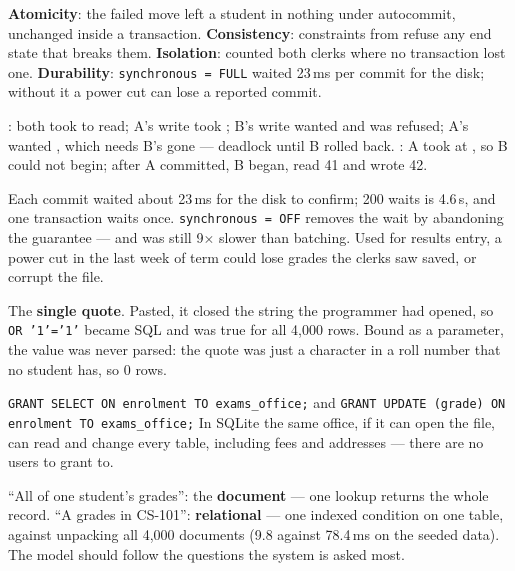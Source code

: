 \begin{ans}
  \item \textbf{Atomicity}: the failed move left a student in nothing under
        autocommit, unchanged inside a transaction. \textbf{Consistency}:
        constraints from  refuse any end state that breaks
        them. \textbf{Isolation}:  counted both clerks where
        no transaction lost one. \textbf{Durability}: \texttt{synchronous =
        FULL} waited 23\,ms per commit for the disk; without it a power cut can
        lose a reported commit.
  \item {}: both took  to read; A's write took
        ; B's write wanted  and was refused;
        A's  wanted , which needs B's
         gone --- deadlock until B rolled back.
        : A took  at , so B
        could not begin; after A committed, B began, read 41 and wrote 42.
  \item Each commit waited about 23\,ms for the disk to confirm; 200 waits is
        4.6\,s, and one transaction waits once. \texttt{synchronous = OFF}
        removes the wait by abandoning the guarantee --- and was still
        9$\times$ slower than batching. Used for results entry, a power cut in
        the last week of term could lose grades the clerks saw saved, or
        corrupt the file.
\end{ans}

\begin{ans}
  \item The \textbf{single quote}. Pasted, it closed the string the programmer
        had opened, so \texttt{OR '1'='1'} became SQL and was true for all
        4{,}000 rows. Bound as a parameter, the value was never parsed: the
        quote was just a character in a roll number that no student has, so 0
        rows.
  \item \texttt{GRANT SELECT ON enrolment TO exams\_office;} and
        \texttt{GRANT UPDATE (grade) ON enrolment TO exams\_office;} In SQLite
        the same office, if it can open the file, can read and change every
        table, including fees and addresses --- there are no users to grant to.
  \item ``All of one student's grades'': the \textbf{document} --- one lookup
        returns the whole record. ``A grades in CS-101'': \textbf{relational}
        --- one indexed condition on one table, against unpacking all 4{,}000
        documents (9.8 against 78.4\,ms on the seeded data). The model should
        follow the questions the system is asked most.
\end{ans}
